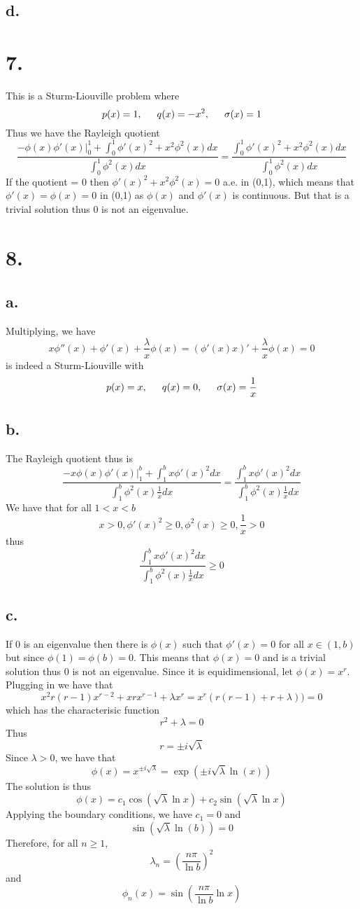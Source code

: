 \documentclass[11pt]{article}
\theoremstyle{mystyle}
\theoremstyle{definition}
\begin{document}
\subsection*{d.}
\newpage
\section*{7.}
This is a Sturm-Liouville problem where
\[
  p(x) = 1, \indent q(x) = -x^2, \indent \sigma(x) = 1
\]
Thus we have the Rayleigh quotient
\[
  \displaystyle\frac{- \phi(x) \phi'(x) |^1_0 + \int_0^1 \phi'(x)^2 +x^2 \phi^2(x) dx}{\int_0^1 \phi^2(x) dx} = \displaystyle\frac{\int_0^1 \phi'(x)^2 + x^2 \phi^2(x)dx}{\int_0^1 \phi^2(x) dx}
\]
If the quotient = 0 then $\phi'(x)^2 + x^2 \phi^2(x) = 0$ a.e. in (0,1), which means that $\phi'(x) = \phi(x) = 0$ in (0,1) as $\phi(x)$ and $\phi'(x)$ is continuous. But that is a trivial solution thus 0 is not an eigenvalue.
\newpage
\section*{8.}
\subsection*{a.}
Multiplying, we have 
\[
  x \phi''(x) + \phi'(x) + \displaystyle\frac{\lambda}{x}\phi(x) = (\phi'(x)x)' + \displaystyle\frac{\lambda}{x}\phi(x) = 0
\]
is indeed a Sturm-Liouville with 
\[
  p(x) = x, \indent q(x) = 0, \indent \sigma(x) = \displaystyle\frac{1}{x}
\]
\subsection*{b.}
The Rayleigh quotient thus is 
\[ 
  \displaystyle\frac{-x \phi(x) \phi'(x) |^b_1 + \int_1^b x\phi'(x)^2 dx}{\int_1^b \phi^2(x) \displaystyle\frac{1}{x} dx} = \displaystyle\frac{\int_1^b x\phi'(x)^2 dx}{\int_1^b \phi^2(x)\displaystyle\frac{1}{x} dx}
\]
We have that for all $1<x<b$
\[
  x > 0, \phi'(x)^2 \ge 0, \phi^2(x) \ge 0, \displaystyle\frac{1}{x} > 0
\]
thus 
\[
 \displaystyle\frac{\int_1^b x\phi'(x)^2 dx}{\int_1^b \phi^2(x)\displaystyle\frac{1}{x} dx} \ge 0 
\]
\subsection*{c.}
If 0 is an eigenvalue then there is $\phi(x)$ such that $\phi'(x) = 0$ for all $x \in (1,b)$ but since $\phi(1) = \phi(b) = 0$. This means that $\phi(x) = 0$ and is a trivial solution thus 0 is not an eigenvalue. 
Since it is equidimensional, let $\phi(x) = x^r$. Plugging in we have that
\[
  x^2 r(r-1)x^{r-2} + xrx^{r-1} + \lambda x^r = x^r (r(r-1) + r + \lambda)) = 0  
\]
which has the characterisic function 
\[
  r^2 + \lambda = 0
\]
Thus 
\[
  r = \pm i\sqrt{\lambda}
\]
Since $\lambda > 0$, we have that 
\[
  \phi(x) = x^{\pm i \sqrt{\lambda}} = \exp(\pm i\sqrt{\lambda}\ln(x))
\]
The solution is thus 
\[
  \phi(x) = c_1 \cos(\sqrt{\lambda} \ln x) + c_2 \sin(\sqrt{\lambda} \ln x)
\]
Applying the boundary conditions, we have $c_1 = 0$ and 
\[
  \sin(\sqrt{\lambda} \ln(b)) = 0
\]
Therefore, for all $n\ge 1$,  
\[
  \lambda_n = \left( \displaystyle\frac{n\pi}{\ln b} \right)^2 
\]
and 
\[
  \phi_n(x) = \sin \left(\displaystyle\frac{n\pi}{\ln b} \ln x\right)
\]
\end{document}
